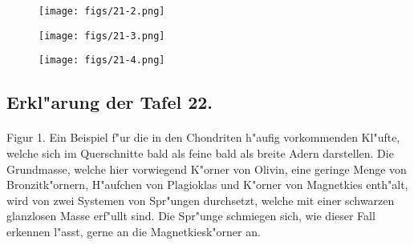 \documentclass[a4paper, 11pt, oneside, polutonikogreek, german]{article}
\begin{document}
\vspace*{\fill}
\begin{figure}[H]
\centering
\texttt{[image: figs/21-2.png]}
\caption{}
\end{figure}
\vspace*{\fill}
\clearpage

\vspace*{\fill}
\begin{figure}[H]
\centering
\texttt{[image: figs/21-3.png]}
\caption{}
\end{figure}
\vspace*{\fill}
\clearpage

\vspace*{\fill}
\begin{figure}[H]
\centering
\texttt{[image: figs/21-4.png]}
\caption{}
\end{figure}
\vspace*{\fill}
\clearpage

\subsection{Erkl"arung der Tafel 22.}
\paragraph{}
Figur 1. Ein Beispiel f"ur die in den Chondriten h"aufig vorkommenden Kl"ufte, welche sich im Querschnitte bald als feine bald als breite Adern darstellen. Die Grundmasse, welche hier vorwiegend K"orner von Olivin, eine geringe Menge von Bronzitk"ornern, H"aufchen von Plagioklas und K"orner von Magnetkies enth"alt, wird von zwei Systemen von Spr"ungen durchsetzt, welche mit einer schwarzen glanzlosen Masse erf"ullt sind. Die Spr"unge schmiegen sich, wie dieser Fall erkennen l"asst, gerne an die Magnetkiesk"orner an.
\end{document}
